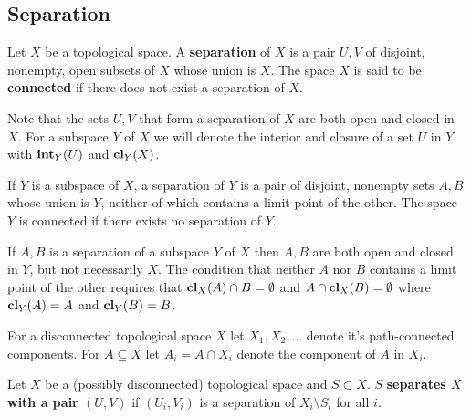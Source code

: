 
\subsection{Separation}

\begin{definition}
  Let $X$ be a topological space. A \textbf{separation} of $X$ is a pair $U, V$ of disjoint, nonempty, open subsets of $X$ whose union is $X$.
  The space $X$ is said to be \textbf{connected} if there does not exist a separation of $X$.
\end{definition}

Note that the sets $U, V$ that form a separation of $X$ are both open and closed in $X$.
For a subspace $Y$ of $X$ we will denote the interior and closure of a set $U$ in $Y$ with $\mathbf{int}_Y(U)$ and $\mathbf{cl}_Y(X)$.

\begin{lemma}
  If $Y$ is a subspace of $X$, a separation of $Y$ is a pair of disjoint, nonempty sets $A, B$ whose union is $Y$, neither of which contains a limit point of the other.
  The space $Y$ is connected if there exists no separation of $Y$.
\end{lemma}

If $A, B$ is a separation of a subspace $Y$ of $X$ then $A, B$ are both open and closed in $Y$, but not necessarily $X$.
The condition that neither $A$ nor $B$ contains a limit point of the other requires that $\mathbf{cl}_X(A)\cap B = \emptyset$ and $A\cap \mathbf{cl}_X(B) =\emptyset$ where $\mathbf{cl}_Y(A) = A$ and $\mathbf{cl}_Y(B) = B$.


For a disconnected topological space $X$ let $X_1, X_2, \ldots$ denote it's path-connected components.
For $A\subseteq X$ let $A_i = A\cap X_i$ denote the component of $A$ in $X_i$.

\begin{definition}
  Let $X$ be a (possibly disconnected) topological space and $S\subset X$.
  $S$ \textbf{separates $X$ with a pair $(U, V)$} if $(U_i, V_i)$ is a separation of $X_i\setminus S_i$ for all $i$.
\end{definition}

